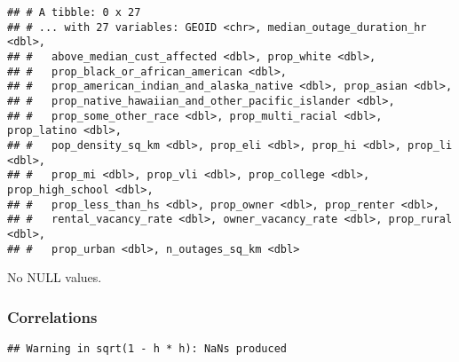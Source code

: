 \documentclass[
]{article}
\newenvironment{Shaded}{\begin{snugshade}}{\end{snugshade}}
\newcommand{\AlertTok}[1]{\textcolor[rgb]{0.94,0.16,0.16}{#1}}
\newcommand{\CommentTok}[1]{\textcolor[rgb]{0.56,0.35,0.01}{\textit{#1}}}
\newcommand{\DataTypeTok}[1]{\textcolor[rgb]{0.13,0.29,0.53}{#1}}
\newcommand{\DecValTok}[1]{\textcolor[rgb]{0.00,0.00,0.81}{#1}}
\newcommand{\KeywordTok}[1]{\textcolor[rgb]{0.13,0.29,0.53}{\textbf{#1}}}
\newcommand{\NormalTok}[1]{#1}
\newcommand{\OperatorTok}[1]{\textcolor[rgb]{0.81,0.36,0.00}{\textbf{#1}}}
\newcommand{\OtherTok}[1]{\textcolor[rgb]{0.56,0.35,0.01}{#1}}
\newcommand{\StringTok}[1]{\textcolor[rgb]{0.31,0.60,0.02}{#1}}
\begin{document}
\begin{verbatim}
## # A tibble: 0 x 27
## # ... with 27 variables: GEOID <chr>, median_outage_duration_hr <dbl>,
## #   above_median_cust_affected <dbl>, prop_white <dbl>,
## #   prop_black_or_african_american <dbl>,
## #   prop_american_indian_and_alaska_native <dbl>, prop_asian <dbl>,
## #   prop_native_hawaiian_and_other_pacific_islander <dbl>,
## #   prop_some_other_race <dbl>, prop_multi_racial <dbl>, prop_latino <dbl>,
## #   pop_density_sq_km <dbl>, prop_eli <dbl>, prop_hi <dbl>, prop_li <dbl>,
## #   prop_mi <dbl>, prop_vli <dbl>, prop_college <dbl>, prop_high_school <dbl>,
## #   prop_less_than_hs <dbl>, prop_owner <dbl>, prop_renter <dbl>,
## #   rental_vacancy_rate <dbl>, owner_vacancy_rate <dbl>, prop_rural <dbl>,
## #   prop_urban <dbl>, n_outages_sq_km <dbl>
\end{verbatim}

No NULL values.

\hypertarget{correlations}{%
\subsubsection{Correlations}\label{correlations}}

\begin{Shaded}
\end{Shaded}

\begin{verbatim}
## Warning in sqrt(1 - h * h): NaNs produced
\end{verbatim}
\end{document}

